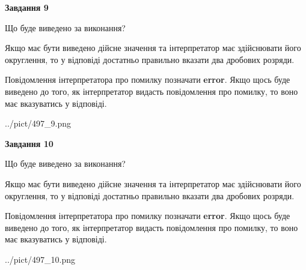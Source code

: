 \documentclass[12pt, ukrainian]{article}
\begin{document}
{\begin {Large}
{\begin {center}\textbf{Завдання 9}\end {center}}\par
Що буде виведено за виконання? \par

Якщо має бути виведено дійсне значення та інтерпретатор має здійснювати його округлення, 
то у відповіді достатньо правильно вказати два дробових розряди.

Повідомлення інтерпретатора про помилку позначати \textbf{error}.
Якщо щось буде виведено до того, як інтерпретатор видасть повідомлення про помилку, 
то воно має вказуватись у відповіді. \par

\begin{center}
	{../pict/497_9.png}
\end{center}
\newpage

{\begin {center}\textbf{Завдання 10}\end {center}}\par
Що буде виведено за виконання? \par

Якщо має бути виведено дійсне значення та інтерпретатор має здійснювати його округлення, 
то у відповіді достатньо правильно вказати два дробових розряди.

Повідомлення інтерпретатора про помилку позначати \textbf{error}.
Якщо щось буде виведено до того, як інтерпретатор видасть повідомлення про помилку, 
то воно має вказуватись у відповіді. \par

\begin{center}
	{../pict/497_10.png}
\end{center}
\newpage

\end {Large}}
\end{document}
